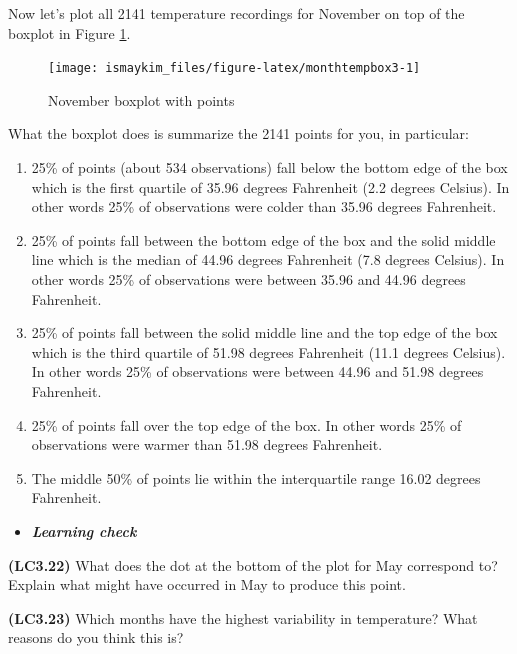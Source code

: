\documentclass[12pt,]{krantz}
\providecommand{\tightlist}{%
  \setlength{\itemsep}{0pt}\setlength{\parskip}{0pt}}
\newenvironment{rmdblock}[1]
  {\begin{shaded*}
  \begin{itemize}
  \renewcommand{\labelitemi}{
    \raisebox{-.7\height}[0pt][0pt]{
    }
  }
  \item
  }
  {
  \end{itemize}
  \end{shaded*}
  }
\newenvironment{learncheck}
  {\begin{rmdblock}{warning}}
  {\end{rmdblock}}
\begin{document}
Now let's plot all 2141 temperature recordings for November on top of
the boxplot in Figure \ref{fig:monthtempbox3}.

\begin{figure}

{\centering \texttt{[image: ismaykim\_files/figure-latex/monthtempbox3-1]} 

}

\caption{November boxplot with points}\label{fig:monthtempbox3}
\end{figure}

What the boxplot does is summarize the 2141 points for you, in
particular:

\begin{enumerate}
\def\labelenumi{\arabic{enumi}.}
\tightlist
\item
  25\% of points (about 534 observations) fall below the bottom edge of
  the box which is the first quartile of 35.96 degrees Fahrenheit (2.2
  degrees Celsius). In other words 25\% of observations were colder than
  35.96 degrees Fahrenheit.
\item
  25\% of points fall between the bottom edge of the box and the solid
  middle line which is the median of 44.96 degrees Fahrenheit (7.8
  degrees Celsius). In other words 25\% of observations were between
  35.96 and 44.96 degrees Fahrenheit.
\item
  25\% of points fall between the solid middle line and the top edge of
  the box which is the third quartile of 51.98 degrees Fahrenheit (11.1
  degrees Celsius). In other words 25\% of observations were between
  44.96 and 51.98 degrees Fahrenheit.
\item
  25\% of points fall over the top edge of the box. In other words 25\%
  of observations were warmer than 51.98 degrees Fahrenheit.
\item
  The middle 50\% of points lie within the interquartile range 16.02
  degrees Fahrenheit.
\end{enumerate}

\begin{learncheck}
\textbf{\emph{Learning check}}
\end{learncheck}

\textbf{(LC3.22)} What does the dot at the bottom of the plot for May
correspond to? Explain what might have occurred in May to produce this
point.

\textbf{(LC3.23)} Which months have the highest variability in
temperature? What reasons do you think this is?
\end{document}
